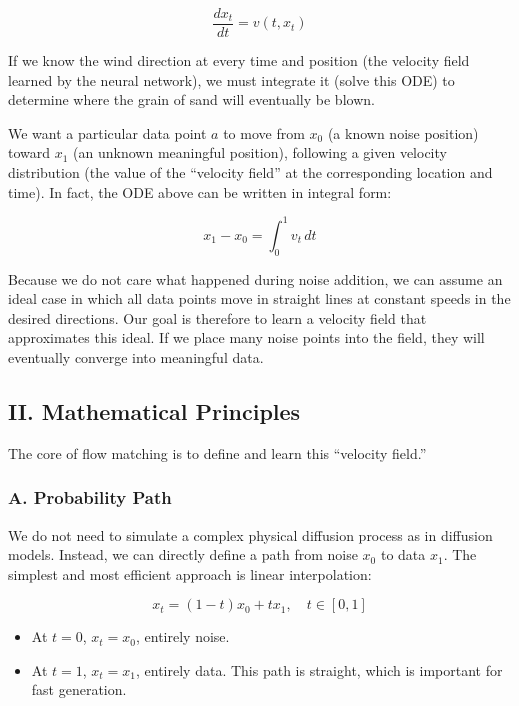 \[
\frac{dx_t}{dt}=v(t,x_t)
\]

If we know the wind direction at every time and position (the velocity field learned by the neural network), we must integrate it (solve this ODE) to determine where the grain of sand will eventually be blown.

We want a particular data point \(a\) to move from \(x_0\) (a known noise position) toward \(x_1\) (an unknown meaningful position), following a given velocity distribution (the value of the ``velocity field'' at the corresponding location and time). In fact, the ODE above can be written in integral form:

\[
x_1-x_0=\int_0^1 v_t\,dt
\]

Because we do not care what happened during noise addition, we can assume an ideal case in which all data points move in straight lines at constant speeds in the desired directions. Our goal is therefore to learn a velocity field that approximates this ideal. If we place many noise points into the field, they will eventually converge into meaningful data.

\hypertarget{ii.-mathematical-principles}{%
\subsection{II. Mathematical Principles}\label{ii.-mathematical-principles}}

The core of flow matching is to define and learn this ``velocity field.''

\hypertarget{a.-probability-path}{%
\subsubsection{A. Probability Path}\label{a.-probability-path}}

We do not need to simulate a complex physical diffusion process as in diffusion models. Instead, we can directly define a path from noise \(x_0\) to data \(x_1\). The simplest and most efficient approach is linear interpolation:

\[
x_t=(1-t)x_0+tx_1,\quad t\in[0,1]
\]

\begin{itemize}
\tightlist
\item
  At \(t=0\), \(x_t=x_0\), entirely noise.
\item
  At \(t=1\), \(x_t=x_1\), entirely data. This path is straight, which is important for fast generation.
\end{itemize}

